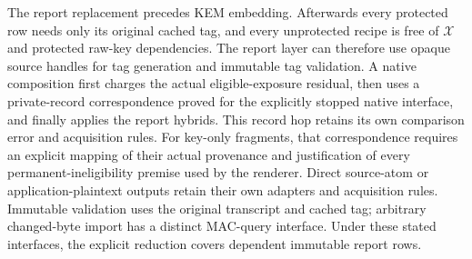 The report replacement precedes KEM embedding.  Afterwards every protected
row needs only its original cached tag, and every unprotected recipe is free
of $\mathcal X$ and protected raw-key dependencies.  The report layer can
therefore use opaque source handles for tag generation and immutable tag
validation.  A native composition first charges the actual eligible-exposure
residual, then uses a private-record correspondence proved for the
explicitly stopped native interface, and finally applies the report hybrids.
This record hop retains its own comparison error and acquisition rules. For
key-only fragments, that correspondence requires an explicit mapping of
their actual provenance and justification of every permanent-ineligibility
premise used by the renderer.
Direct source-atom or application-plaintext outputs retain their own
adapters and acquisition rules. Immutable validation uses the original
transcript and cached tag; arbitrary changed-byte import has a distinct
MAC-query interface. Under these stated interfaces, the explicit reduction
covers dependent immutable report rows.
